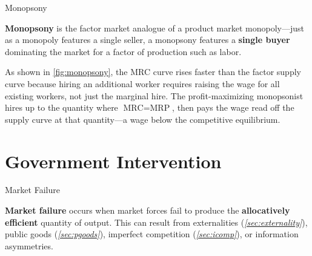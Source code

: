 \documentclass[10pt]{article}
\begin{document}
  \begin{core}{Monopsony}

    \textbf{Monopsony} is the factor market analogue of a product market monopoly---just as a monopoly features a single seller, a monopsony features a \textbf{single buyer} dominating the market for a factor of production such as labor.


    As shown in \autoref{fig:monopsony}, the MRC curve rises faster than the factor supply curve because hiring an additional worker requires raising the wage for all existing workers, not just the marginal hire. The profit-maximizing monopsonist hires up to the quantity where $\text{MRC} = \text{MRP}$, then pays the wage read off the supply curve at that quantity---a wage below the competitive equilibrium.

  \end{core}

\section{Government Intervention}

  \begin{core}{Market Failure}

    \textbf{Market failure} occurs when market forces fail to produce the \textbf{allocatively efficient} quantity of output. This can result from externalities (\textit{\autoref{sec:externality}}), public goods (\textit{\autoref{sec:pgoods}}), imperfect competition (\textit{\autoref{sec:icomp}}), or information asymmetries.

  \end{core}
\end{document}
